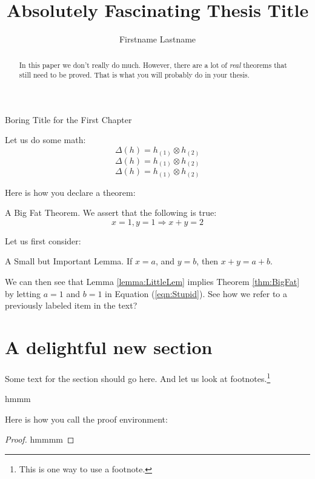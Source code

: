 \documentclass[12pt]{pom_thesis}
\author{Firstname Lastname}
\title{Absolutely Fascinating Thesis Title}
\begin{document}
\maketitle

\begin{abstract}In this paper we don't really do much.  However, there are a lot of {\it real} theorems that still need to be proved. That is what you will probably do in your thesis.
\end{abstract}

\tableofcontents

\newpage
{}
\begin{chapter}{Boring Title for the First Chapter}
\label{Intro}

Let us do some math:
$$ \Delta(h) = h_{(1)} \otimes h_{(2)} $$
\[ \Delta(h) = h_{(1)} \otimes h_{(2)} \]
\begin{equation*}
\Delta(h) = h_{(1)} \otimes h_{(2)}
\end{equation*}

Here is how you declare a theorem:

\begin{thm}{A Big Fat Theorem.} \label{thm:BigFat}
We assert that the following is true:
\begin{equation} \label{eqn:Stupid}
x = 1, y = 1 \Rightarrow x + y = 2
\end{equation}
\end{thm}

Let us first consider:
\begin{lemma}{A Small but Important Lemma.} \label{lemma:LittleLem}
If $x = a$, and $y = b$, then $x + y = a + b$.
\end{lemma}

We can then see that Lemma \ref{lemma:LittleLem} implies Theorem \ref{thm:BigFat} by letting $a = 1$ and $b = 1$ in Equation (\ref{eqn:Stupid}). See how we refer to a previously labeled item in the text?

\section{A delightful new section}

Some text for the section should go here. And let us look at footnotes.\footnote{This is one way to use a footnote.} \footnotemark



\begin{thm}
hmmm
\end{thm}

Here is how you call the proof environment:

\begin{proof}
hmmmm
\end{proof}

\end{chapter}
\end{document}
